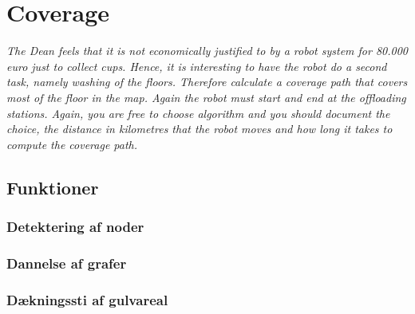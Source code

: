 \section{Coverage}
\label{sec:cov}
\textit{The Dean feels that it is not economically justified to by a robot system for 80.000 euro just to collect cups. Hence, it is interesting to have the robot do a second task, namely washing of the floors. Therefore calculate a coverage path that covers most of the floor in the map. Again the robot must start and end at the offloading stations.
Again, you are free to choose algorithm and you should document the choice, the distance in kilometres that the robot moves and how long it takes to compute the coverage path.}

\subsection{Funktioner}

\subsubsection{Detektering af noder}


\subsubsection{Dannelse af grafer}

\subsubsection{Dækningssti af gulvareal}